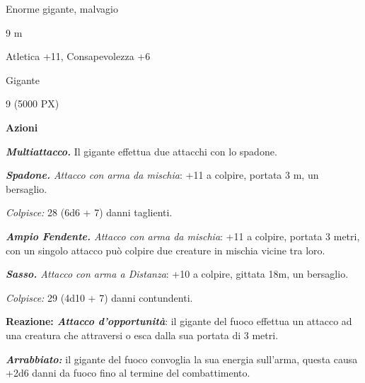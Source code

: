 \begin{multicols}{2}
{
\begin{description}[noitemsep, topsep=0pt, parsep=0pt, partopsep=0pt, itemsep=1pt, leftmargin=2.35cm,  labelwidth=2.2cm, itemindent=0cm, listparindent=0pt] %
\setlength{\baselineskip}{10pt}
\item[\textbf{Taglia/Tipo}] Enorme gigante, malvagio
\item[\textbf{Caratt.}] 
\item[\textbf{Punti Ferita}] 
\item[\textbf{Movimento}] 9 m
\item[\textbf{Tiri Salvez.}] 
\item[\textbf{Comp.}] Atletica +11, Consapevolezza +6
\item[\textbf{Linguaggi}] Gigante
\item[\textbf{Sfida}] 9 (5000 PX)
\end{description}
\smallskip

\textbf{Azioni}

\emph{\textbf{Multiattacco.}} Il gigante effettua due attacchi con lo spadone.

\emph{\textbf{Spadone.} Attacco con arma da mischia}: +11 a colpire, portata 3 m, un bersaglio.

\emph{Colpisce:} 28 (6d6 + 7) danni taglienti.

\emph{\textbf{Ampio Fendente.} Attacco con arma da mischia}: +11 a colpire, portata 3 metri, con un singolo attacco può colpire due creature in mischia vicine tra loro.

\emph{\textbf{Sasso.} Attacco con arma a Distanza}: +10 a colpire, gittata 18m, un bersaglio.

\emph{Colpisce:} 29 (4d10 + 7) danni contundenti.

\textbf{Reazione: \emph{Attacco d'opportunità}}: il gigante del fuoco effettua un attacco ad una creatura che attraversi o esca dalla sua portata di 3 metri.

\emph{\textbf{Arrabbiato:}} il gigante del fuoco convoglia la sua energia sull'arma, questa causa +2d6 danni da fuoco fino al termine del combattimento.

}
\end{multicols}
